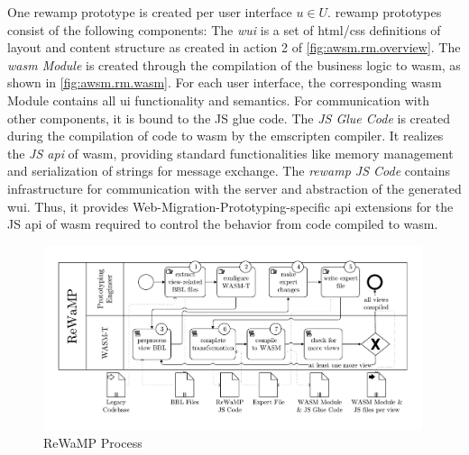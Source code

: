 \vspace{-15pt}
One \gls{rewamp} prototype is created per user interface \(u \in U\).
\gls{rewamp} prototypes \autocite{Heil2018ReWaMP} consist of the following components: The \emph{\gls{wui}} is a set of \gls{html}/\gls{css} definitions of layout and content structure as created in action 2 of \cref{fig:awsm.rm.overview}.
The \emph{\gls{wasm} Module} is created through the compilation of the  business logic to \gls{wasm}, as shown in \cref{fig:awsm.rm.wasm}.
For each  user interface, the corresponding \gls{wasm} Module contains all \gls{ui} functionality and semantics.
For communication with other components, it is bound to the JS glue code.
The \emph{JS Glue Code} is created during the compilation of  code to \gls{wasm} by the emscripten compiler.
It realizes the \emph{JS \gls{api}} of \gls{wasm}, providing standard functionalities like memory management and serialization of strings for message exchange.
The \emph{\gls{rewamp} JS Code} contains infrastructure for communication with the server and abstraction of the generated \gls{wui}.
Thus, it provides Web-Migration-Prototyping-specific \gls{api} extensions for the JS \gls{api} of \gls{wasm} required to control the behavior from  code compiled to \gls{wasm}.

\begin{figure}[h!]
\hypertarget{fig:awsm.rm.rewamp.process}{%
\centering
\includegraphics[width=0.99\textwidth]{../figures/rewamp/BPMN_RWMP.pdf}
\caption[ReWaMP Process]{ReWaMP Process \autocite[adapted from][]{Heil2018ReWaMP}}\label{fig:awsm.rm.rewamp.process}
}
\end{figure}

